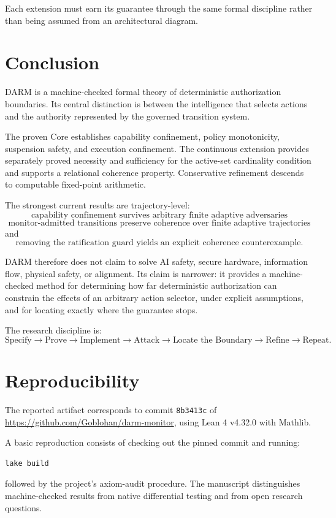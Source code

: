 \documentclass[11pt]{article}
\begin{document}
Each extension must earn its guarantee through the same formal discipline rather than being assumed from an architectural diagram.

\section{Conclusion}
DARM is a machine-checked formal theory of deterministic authorization boundaries. Its central distinction is between the intelligence that selects actions and the authority represented by the governed transition system.

The proven Core establishes capability confinement, policy monotonicity, suspension safety, and execution confinement. The continuous extension provides separately proved necessity and sufficiency for the active-set cardinality condition and supports a relational coherence property. Conservative refinement descends to computable fixed-point arithmetic.

The strongest current results are trajectory-level:
\[
\boxed{\text{capability confinement survives arbitrary finite adaptive adversaries}}
\]
\[
\boxed{\text{monitor-admitted transitions preserve coherence over finite adaptive trajectories}}
\]
and
\[
\boxed{\text{removing the ratification guard yields an explicit coherence counterexample}.}
\]

DARM therefore does not claim to solve AI safety, secure hardware, information flow, physical safety, or alignment. Its claim is narrower: it provides a machine-checked method for determining how far deterministic authorization can constrain the effects of an arbitrary action selector, under explicit assumptions, and for locating exactly where the guarantee stops.

The research discipline is:
\[
\boxed{
\text{Specify}\rightarrow
\text{Prove}\rightarrow
\text{Implement}\rightarrow
\text{Attack}\rightarrow
\text{Locate the Boundary}\rightarrow
\text{Refine}\rightarrow
\text{Repeat}.
}
\]

\section*{Reproducibility}
The reported artifact corresponds to commit \texttt{8b3413c} of
\url{https://github.com/Goblohan/darm-monitor}, using Lean 4 v4.32.0 with Mathlib.

A basic reproduction consists of checking out the pinned commit and running:
\begin{verbatim}
lake build
\end{verbatim}
followed by the project's axiom-audit procedure. The manuscript distinguishes machine-checked results from native differential testing and from open research questions.



\end{document}
